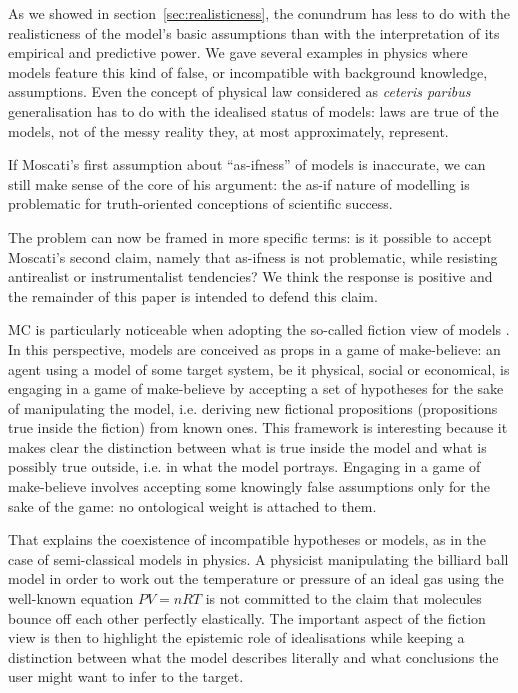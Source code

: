 \documentclass[a4paper,11pt]{article}
\theoremstyle{definition}
\begin{document}
As we showed in section~\ref{sec:realisticness}, the conundrum has less to do with the realisticness of the model's basic assumptions than with the interpretation of its empirical and predictive power. We gave several examples in physics where models feature this kind of false, or incompatible with background knowledge, assumptions. Even the concept of physical law considered as \textit{ceteris paribus} generalisation \citep{Cartwright1983} has to do with the idealised status of models: laws are true of the models, not of the messy reality they, at most approximately, represent.

If Moscati's first assumption about ``as-ifness'' of models is inaccurate, we can still make sense of the core of his argument: the as-if nature of modelling is problematic for truth-oriented conceptions of scientific success.

The problem can now be framed in more specific terms: is it possible to accept Moscati's second claim, namely that as-ifness is not problematic, while resisting antirealist or instrumentalist tendencies? We think the response is positive and the remainder of this paper is intended to defend this claim.

MC is particularly noticeable when adopting the so-called fiction view of models \citep{Frigg2016, Frigg2020, Toon2012}. In this perspective, models are conceived as props in a game of make-believe: an agent using a model of some target system, be it physical, social or economical, is engaging in a game of make-believe by accepting a set of hypotheses for the sake of manipulating the model, i.e. deriving new fictional propositions (propositions true inside the fiction) from known ones. This framework is interesting because it makes clear the distinction between what is true inside the model and what is possibly true outside, i.e. in what the model portrays. Engaging in a game of make-believe involves accepting some knowingly false assumptions only for the sake of the game: no ontological weight is attached to them.

That explains the coexistence of incompatible hypotheses or models, as in the case of semi-classical models in physics. A physicist manipulating the billiard ball model in order to work out the temperature or pressure of an ideal gas using the well-known equation $PV=nRT$ is not committed to the claim that molecules bounce off each other perfectly elastically. The important aspect of the fiction view is then to highlight the epistemic role of idealisations while keeping a distinction between what the model describes literally and what conclusions the user might want to infer to the target.
\end{document}
